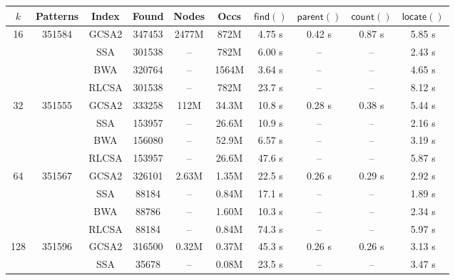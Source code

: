 \documentclass[twoside,leqno,twocolumn]{article}
\newcommand{\find}{\ensuremath{\mathsf{find}}}
\newcommand{\locate}{\ensuremath{\mathsf{locate}}}
\newcommand{\parent}{\ensuremath{\mathsf{parent}}}
\newcommand{\countq}{\ensuremath{\mathsf{count}}}
\begin{document}
\begin{table*}[t]
\begin{center}
\begin{tabular}{cc|cccc|cccc}
\hline
$k$ & \textbf{Patterns} & \textbf{Index} & \textbf{Found} & \textbf{Nodes} & \textbf{Occs} & $\find()$ & $\parent()$ & $\countq()$ & $\locate()$ \\
\hline
 16 & 351584 & GCSA2 & 347453 & 2477M &  872M & 4.75 \textmu{}s & 0.42 \textmu{}s & 0.87 \textmu{}s & 5.85 \textmu{}s \\
    &        & SSA   & 301538 &    -- &  782M & 6.00 \textmu{}s &              -- &              -- & 2.43 \textmu{}s \\
    &        & BWA   & 320764 &    -- & 1564M & 3.64 \textmu{}s &              -- &              -- & 4.65 \textmu{}s \\
    &        & RLCSA & 301538 &    -- &  782M & 23.7 \textmu{}s &              -- &              -- & 8.12 \textmu{}s \\
\hline
 32 & 351555 & GCSA2 & 333258 &  112M & 34.3M & 10.8 \textmu{}s & 0.28 \textmu{}s & 0.38 \textmu{}s & 5.44 \textmu{}s \\
    &        & SSA   & 153957 &    -- & 26.6M & 10.9 \textmu{}s &              -- &              -- & 2.16 \textmu{}s \\
    &        & BWA   & 156080 &    -- & 52.9M & 6.57 \textmu{}s &              -- &              -- & 3.19 \textmu{}s \\
    &        & RLCSA & 153957 &    -- & 26.6M & 47.6 \textmu{}s &              -- &              -- & 5.87 \textmu{}s \\
\hline
  64 & 351567 & GCSA2 & 326101 & 2.63M & 1.35M & 22.5 \textmu{}s & 0.26 \textmu{}s & 0.29 \textmu{}s & 2.92 \textmu{}s \\
     &        & SSA   &  88184 &    -- & 0.84M & 17.1 \textmu{}s &              -- &              -- & 1.89 \textmu{}s \\
     &        & BWA   &  88786 &    -- & 1.60M & 10.3 \textmu{}s &              -- &              -- & 2.34 \textmu{}s \\
     &        & RLCSA &  88184 &    -- & 0.84M & 74.3 \textmu{}s &              -- &              -- & 5.97 \textmu{}s \\
\hline
 128 & 351596 & GCSA2 & 316500 & 0.32M & 0.37M & 45.3 \textmu{}s & 0.26 \textmu{}s & 0.26 \textmu{}s & 3.13 \textmu{}s \\
     &        & SSA   &  35678 &    -- & 0.08M & 23.5 \textmu{}s &              -- &              -- & 3.47 \textmu{}s \\

\end{tabular}
\end{center}
\end{table*}
\end{document}
